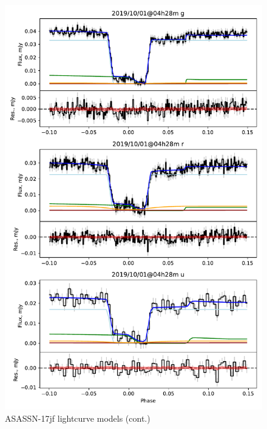 \begin{figure}
    \centering
    \includegraphics[width=\textwidth]{figures/results/three_cvs_with_weird_colours/ASASSN-17jf/ASASSN-17jf_3.pdf}
    \caption{ASASSN-17jf lightcurve models (cont.)}
    \label{fig:ASASSN-17jf all lightcurves cont 2}
\end{figure}




